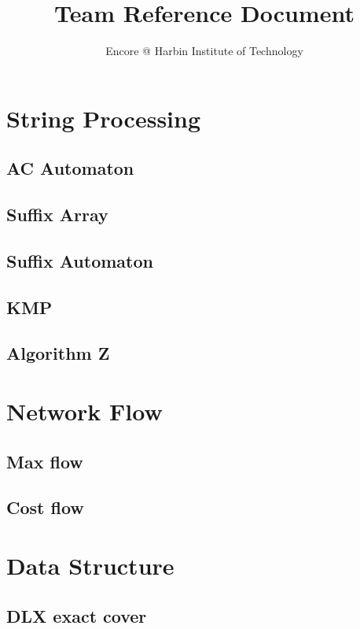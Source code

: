 \documentclass[a4paper,5pt,twocolumn,titlepage]{article}
\title{Team Reference Document}
\author{Encore @ Harbin Institute of Technology}
\begin{document}
\begin{CJK*}{GBK}{song}
\maketitle \tableofcontents
\newpage
{}
\section{String Processing}
\subsection{AC Automaton}

\subsection{Suffix Array}

\subsection{Suffix Automaton}

\subsection{KMP}

\subsection{Algorithm Z}

\section{Network Flow}
\subsection{Max flow}

\subsection{Cost flow}

\section{Data Structure}
\subsection{DLX exact cover}


\end{CJK*}
\end{document}
